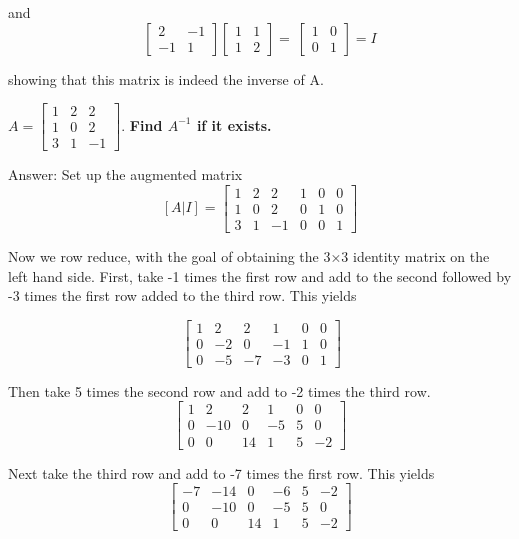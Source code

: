 \documentclass{article}
\begin{document}
\begin{description}[style=nextline]
and
$$\left[ \begin{array}{rr} 2 & -1 \\ -1 & 1 \end{array} \right] \left[ \begin{array}{rr} 1 & 1 \\ 1 & 2 \end{array} \right] = \ \left[ \begin{array}{rr} 1 & 0 \\ 0 & 1 \end{array} \right] = I$$

showing that this matrix is indeed the inverse of A.

\item[Question 10: Let]
$A=\left[ \begin{array}{rrr} 1 & 2 & 2 \\ 1 & 0 & 2 \\ 3 & 1 & -1 \end{array} \right]$. \textbf{Find $A^{-1}$ if it exists.}

Answer: Set up the augmented matrix
$$\left[ A|I\right] = \left[ \begin{array}{rrr|rrr} 1 & 2 & 2 & 1 & 0 & 0 \\ 1 & 0 & 2 & 0 & 1 & 0 \\ 3 & 1 & -1 & 0 & 0 & 1 \end{array} \right]$$

Now we row reduce, with the goal of obtaining the  3×3  identity matrix on the left hand side. First, take -1 times the first row and add to the second followed by -3 times the first row added to the third row. This yields

$$\ \left[ \begin{array}{rrr|rrr} 1 & 2 & 2 & 1 & 0 & 0 \\ 0 & -2 & 0 & -1 & 1 & 0 \\ 0 & -5 & -7 & -3 & 0 & 1 \end{array} \right]$$

Then take 5 times the second row and add to -2 times the third row.
$$\left[ \begin{array}{rrr|rrr} 1 & 2 & 2 & 1 & 0 & 0 \\ 0 & -10 & 0 & -5 & 5 & 0 \\ 0 & 0 & 14 & 1 & 5 & -2 \end{array} \right]$$

Next take the third row and add to -7 times the first row. This yields
$$\left[ \begin{array}{rrr|rrr} -7 & -14 & 0 & -6 & 5 & -2 \\ 0 & -10 & 0 & -5 & 5 & 0 \\ 0 & 0 & 14 & 1 & 5 & -2 \end{array} \right]$$


\end{description}
\end{document}
